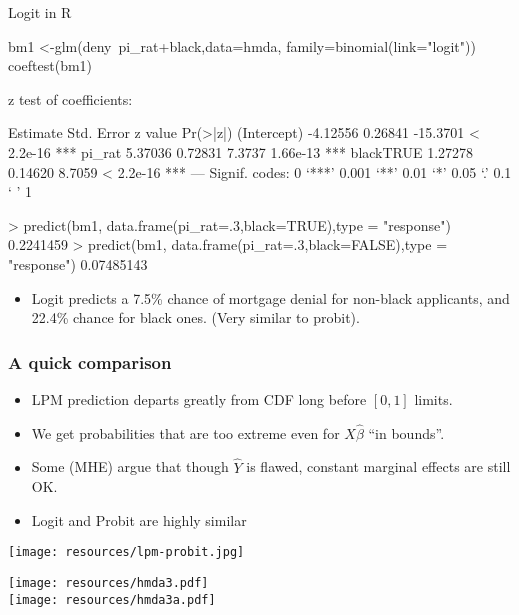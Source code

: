 \documentclass[aspectratio=169]{beamer}
\begin{document}
\begin{frame}[fragile]{Logit in R}
\footnotesize
\begin{semiverbatim}
bm1 <-glm(deny~pi_rat+black,data=hmda, family=binomial(link="logit"))
coeftest(bm1)

z test of coefficients:

            Estimate Std. Error  z value  Pr(>|z|)    
(Intercept) -4.12556    0.26841 -15.3701 < 2.2e-16 ***
pi_rat       5.37036    0.72831   7.3737  1.66e-13 ***
blackTRUE    1.27278    0.14620   8.7059 < 2.2e-16 ***
---
    Signif. codes:  0 `***' 0.001 `**' 0.01 `*' 0.05 `.' 0.1 ` ' 1

> predict(bm1, data.frame(pi_rat=.3,black=TRUE),type = "response")
0.2241459 
> predict(bm1, data.frame(pi_rat=.3,black=FALSE),type = "response")
0.07485143  
\end{semiverbatim}
\begin{itemize}
\item Logit predicts a 7.5\% chance of mortgage denial for non-black applicants, and 22.4\% chance for black ones. (Very similar to probit).
\end{itemize}
\end{frame}



\begin{frame}
\frametitle{A quick comparison}
\begin{itemize}
\item LPM prediction departs greatly from CDF long before $[0,1]$ limits.
\item We get probabilities that are too extreme even for $X\hat{\beta}$ ``in bounds''.
\item Some (MHE) argue that though $\hat{Y}$ is flawed, constant marginal effects are still OK.
\item Logit and Probit are highly similar
\end{itemize}
\begin{center}
\texttt{[image: resources/lpm-probit.jpg]}
\end{center}
\end{frame}

\begin{frame}
\begin{center}
\texttt{[image: resources/hmda3.pdf]}\\
\texttt{[image: resources/hmda3a.pdf]}\\
\end{center}
\end{frame}
\end{document}
